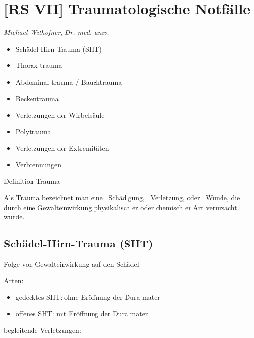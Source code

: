 \documentclass{article}
\begin{document}
\section{[RS VII] Traumatologische Notf\"alle}
{\mdseries\itshape
Michael Withofner, Dr. med. univ.}

\begin{itemize}
\item {\mdseries
Sch\"adel-Hirn-Trauma (SHT)}

\item {\mdseries
Thorax trauma}

\item {\mdseries
Abdominal trauma / Bauchtrauma}

\item {\mdseries
Beckentrauma}

\item {\mdseries
Verletzungen der Wirbels\"aule}

\item {\mdseries
Polytrauma}

\item {\mdseries
Verletzungen der Extremit\"aten}

\item {\mdseries
Verbrennungen}

\end{itemize}
{\mdseries\color{black}
Definition Trauma}

{\mdseries
Als Trauma  bezeichnet man eine {\textperiodcentered}~Sch\"adigung,
{\textperiodcentered}~Verletzung, oder {\textperiodcentered}~Wunde, die
durch eine Gewalteinwirkung physikalisch er oder chemisch er Art
verursacht wurde.}

\subsection{Sch\"adel-Hirn-Trauma (SHT)}
{\mdseries
Folge von Gewalteinwirkung auf den  Sch\"adel}

{\mdseries\color{black}
Arten:}

\begin{itemize}
\item {\mdseries
gedecktes SHT: ohne  Er\"offnung der Dura  mater}

\item {\mdseries
offenes SHT: mit  Er\"offnung der Dura mater}

\end{itemize}
{\mdseries\color{black}
begleitende Verletzungen:}
\end{document}
